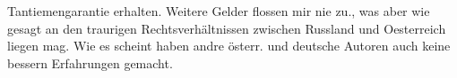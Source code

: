                Tantiemengarantie erhalten. Weitere Gelder flossen mir nie zu., was aber wie gesagt
               an den traurigen Rechtsverhältnissen zwischen Russland und Oesterreich liegen mag.
               Wie es scheint haben andre österr. und deutsche Autoren auch keine bessern Erfahrungen
               gemacht.\pend
           \endnumbering{}  
      